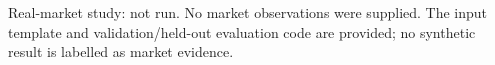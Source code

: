 Real-market study: not run. No market observations were supplied. The input template and validation/held-out evaluation code are provided; no synthetic result is labelled as market evidence.
